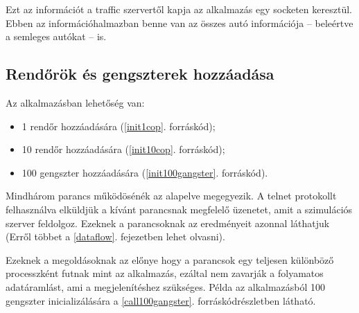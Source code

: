 \documentclass[a4paper,12pt]{report}
\begin{document}
\vspace{2mm}
Ezt az információt a traffic szervertől kapja az alkalmazás egy socketen keresztül. Ebben az információhalmazban benne van az összes autó információja -- beleértve a semleges autókat -- is.

\subsection{Rendőrök és gengszterek hozzáadása}
\label{addcops}

Az alkalmazásban lehetőség van:

\begin{itemize}
\item 1 rendőr hozzáadására (\ref{init1cop}. forráskód);
\item 10 rendőr hozzáadására (\ref{init10cop}. forráskód);
\item 100 gengszter hozzáadására (\ref{init100gangster}. forráskód).
\end{itemize}







Mindhárom parancs működösénék az alapelve megegyezik. A telnet protokollt felhasználva elküldjük a kívánt parancsnak megfelelő üzenetet, amit a szimulációs szerver feldolgoz. Ezeknek a parancsoknak az eredményeit azonnal láthatjuk (Erről többet a \ref{dataflow}. fejezetben lehet olvasni).

\vspace{2mm}
Ezeknek a megoldásoknak az előnye hogy a parancsok egy teljesen különböző processzként futnak mint az alkalmazás, ezáltal nem zavarják a folyamatos adatáramlást, ami a megjelenítéshez szükséges. Példa az alkalmazásból 100 gengszter inicializálására a \ref{call100gangster}. forráskódrészletben látható.


\end{document}
